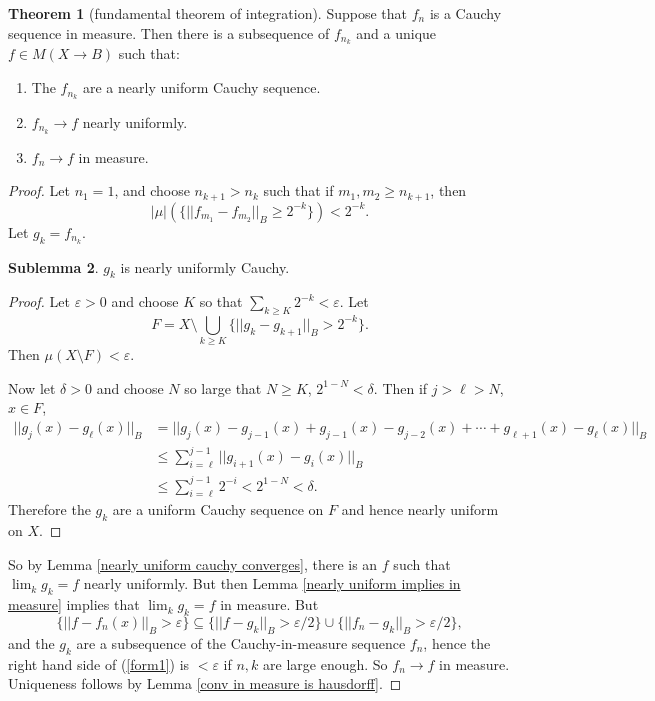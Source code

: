 \documentclass[12pt]{book}
\theoremstyle{definition}
\newtheorem{theorem}{Theorem}[section]
\newtheorem{sublemma}[theorem]{Sublemma}
\begin{document}
\begin{theorem}[fundamental theorem of integration]
Suppose that $f_n$ is a Cauchy sequence in measure. Then there is a subsequence of $f_{n_k}$ and a unique $f \in M(X \to B)$ such that:
\begin{enumerate}
\item The $f_{n_k}$ are a nearly uniform Cauchy sequence.
\item $f_{n_k} \to f$ nearly uniformly.
\item $f_n \to f$ in measure.
\end{enumerate}
\end{theorem}
\begin{proof}
Let $n_1 = 1$, and choose $n_{k+1} > n_k$ such that if $m_1, m_2 \geq n_{k+1}$, then
$$|\mu|(\{||f_{m_1} - f_{m_2}||_B \geq 2^{-k}\}) < 2^{-k}.$$
Let $g_k = f_{n_k}$.
\begin{sublemma}
$g_k$ is nearly uniformly Cauchy.
\end{sublemma}
\begin{proof}
Let $\varepsilon > 0$ and choose $K$ so that $\sum_{k\geq K} 2^{-k} < \varepsilon$. Let
$$F = X \setminus \bigcup_{k \geq K} \{||g_k - g_{k+1}||_B > 2^{-k}\}.$$
Then $\mu(X \setminus F) < \varepsilon$.

Now let $\delta > 0$ and choose $N$ so large that $N \geq K$, $2^{1-N} < \delta$. Then if $j > \ell > N$, $x \in F$,
\begin{align*}
||g_j(x) - g_\ell(x)||_B &= ||g_j(x) - g_{j-1}(x) + g_{j-1}(x) - g_{j-2}(x) + \cdots + g_{\ell+1}(x) - g_\ell(x)||_B\\
&\leq \sum_{i=\ell}^{j-1} ||g_{i+1}(x) - g_i(x)||_B\\
&\leq \sum_{i=\ell}^{j-1} 2^{-i} < 2^{1-N} < \delta.
\end{align*}
Therefore the $g_k$ are a uniform Cauchy sequence on $F$ and hence nearly uniform on $X$.
\end{proof}
So by Lemma \ref{nearly uniform cauchy converges}, there is an $f$ such that $\lim_k g_k = f$ nearly uniformly.
But then Lemma \ref{nearly uniform implies in measure} implies that $\lim_k g_k = f$ in measure.
But
\begin{equation}
\label{form1}\{||f - f_n(x)||_B > \varepsilon\} \subseteq \{||f - g_k||_B > \varepsilon/2\} \cup \{||f_n - g_k||_B > \varepsilon/2\},
\end{equation}
and the $g_k$ are a subsequence of the Cauchy-in-measure sequence $f_n$, hence the right hand side of (\ref{form1}) is $<\varepsilon$ if $n,k$ are large enough. So $f_n \to f$ in measure.
Uniqueness follows by Lemma \ref{conv in measure is hausdorff}.
\end{proof}
\end{document}
